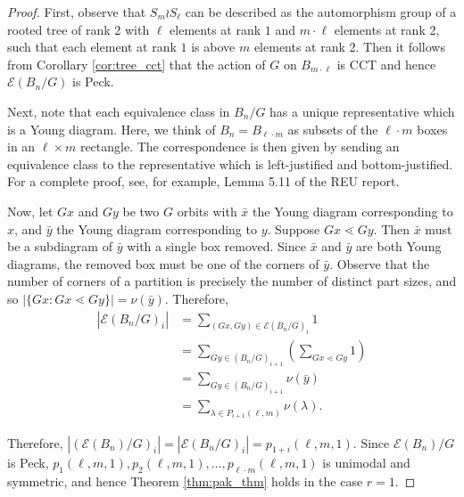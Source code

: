 \documentclass[smallextended, envcountsame, numbook]{svjour3}
\theoremstyle{plain}
\theoremstyle{definition}
\theoremstyle{remark}
\numberwithin{equation}{section}
\begin{document}
\begin{proof}

First, observe that $S_m \wr S_\ell$ can be described as the automorphism group of a rooted tree of rank 2 with $\ell$ elements at rank $1$ and $m\cdot \ell$ elements at rank 2, such that each element at rank $1$ is above $m$ elements at rank 2. Then it follows from Corollary \ref{cor:tree_cct} that the action of $G$ on $B_{m \cdot \ell}$ is CCT and hence $\mathcal E(B_n/G)$ is Peck.

Next, note that each equivalence class in $B_n/G$ has a unique representative which is a Young diagram.  Here, we think of $B_n = B_{\ell \cdot m}$ as subsets of the $\ell \cdot m$ boxes in an $\ell \times m$ rectangle. The correspondence is then given by sending an equivalence class to the representative which is left-justified and bottom-justified.
 For a complete proof, see, for example, Lemma 5.11 of the REU report.

Now, let $Gx$ and $Gy$ be two $G$ orbits with $\bar x$ the Young diagram corresponding to $x$, and $\bar y$ the Young diagram corresponding to $y$. Suppose $Gx \lessdot Gy$. Then $\bar x$ must be a subdiagram of $\bar y$ with a single box removed. Since $\bar x$ and $\bar y$ are both Young diagrams, the removed box must be one of the corners of $\bar y$. Observe that the number of corners of a partition is precisely the number of distinct part sizes, and so $|\{Gx\colon Gx \lessdot Gy\}| = \nu(\bar y)$. Therefore,
\begin{align*}
  |\mathcal E(B_n/G)_i| &= \sum_{(Gx,Gy) \in \mathcal E(B_n/G)_i} 1 
  \\
  &= \sum_{Gy \in (B_n/G)_{i+1}} \left(\sum_{Gx \lessdot Gy}^{} 1 \right) 
  \\
  &= \sum_{Gy \in (B_n/G)_{i+1}}\nu(\bar y) 
  \\
  &=  \sum_{\lambda \in P_{i+1}(\ell,m)} \nu(\lambda).
\end{align*}

Therefore, $|(\mathcal E(B_n)/G)_i| = |\mathcal E(B_n/G)_i| = p_{1+i}(\ell,m,1)$. Since $\mathcal E(B_n)/G$ is Peck,
\linebreak
$p_1(\ell,m,1), p_{2}(\ell,m,1),\ldots, p_{\ell\cdot m}(\ell,m,1)$ is unimodal and symmetric, and hence Theorem \ref{thm:pak_thm} holds in the case $r = 1$.
\end{proof}






\end{document}
